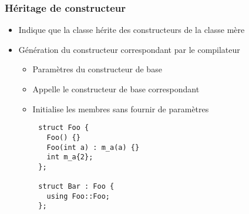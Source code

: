 \documentclass[C++.tex]{subfiles}
\begin{document}
\begin{frame}[fragile]
	\frametitle{Héritage de constructeur}
	\begin{itemize}
		\item Indique que la classe hérite des constructeurs de la classe mère
		\item Génération du constructeur correspondant par le compilateur
		\begin{itemize}
			\item Paramètres du constructeur de base
			\item Appelle le constructeur de base correspondant
			\item Initialise les membres sans fournir de paramètres

		\end{itemize}
	\end{itemize}

	\begin{verbatim}
		struct Foo {
		  Foo() {}
		  Foo(int a) : m_a(a) {}
		  int m_a{2};
		};

		struct Bar : Foo {
		  using Foo::Foo;
		};
	\end{verbatim}

\end{frame}
\end{document}
